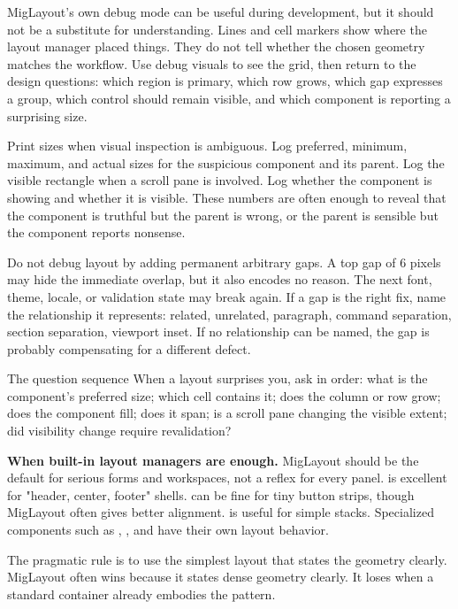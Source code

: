 MigLayout's own debug mode can be useful during development, but it should not
be a substitute for understanding. Lines and cell markers show where the layout
manager placed things. They do not tell whether the chosen geometry matches the
workflow. Use debug visuals to see the grid, then return to the design
questions: which region is primary, which row grows, which gap expresses a
group, which control should remain visible, and which component is reporting a
surprising size.

Print sizes when visual inspection is ambiguous. Log preferred, minimum,
maximum, and actual sizes for the suspicious component and its parent. Log the
visible rectangle when a scroll pane is involved. Log whether the component is
showing and whether it is visible. These numbers are often enough to reveal that
the component is truthful but the parent is wrong, or the parent is sensible but
the component reports nonsense.

Do not debug layout by adding permanent arbitrary gaps. A top gap of 6 pixels
may hide the immediate overlap, but it also encodes no reason. The next font,
theme, locale, or validation state may break again. If a gap is the right fix,
name the relationship it represents: related, unrelated, paragraph, command
separation, section separation, viewport inset. If no relationship can be
named, the gap is probably compensating for a different defect.

\begin{detailbox}{The question sequence}
When a layout surprises you, ask in order: what is the component's preferred size; which cell contains it; does the column or row grow; does the component fill; does it span; is a scroll pane changing the visible extent; did visibility change require revalidation?
\end{detailbox}

\textbf{When built-in layout managers are enough.}
MigLayout should be the default for serious forms and workspaces, not a reflex for every panel.  is excellent for "header, center, footer" shells.  can be fine for tiny button strips, though MigLayout often gives better alignment.  is useful for simple stacks. Specialized components such as , , and  have their own layout behavior.

The pragmatic rule is to use the simplest layout that states the geometry clearly. MigLayout often wins because it states dense geometry clearly. It loses when a standard container already embodies the pattern.

